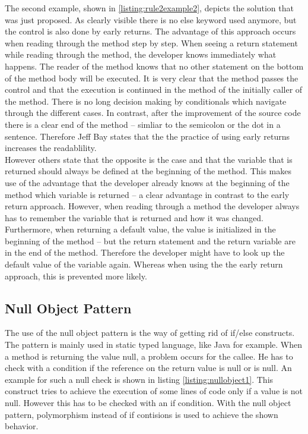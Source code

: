 The second example, shown in \ref{listing:rule2example2}, depicts the solution that was just proposed. As clearly visible there is no else keyword used anymore, but the control is also done by early returns. The advantage of this approach occurs when reading through the method step by step. When seeing a return statement while reading through the method, the developer knows immediately what happens. The reader of the method knows that no other statement on the bottom of the method body will be executed. It is very clear that the method passes the control and that the execution is continued in the method of the initially caller of the method. There is no long decision making by conditionals which navigate through the different cases. In contrast, after the improvement of the source code there is a clear end of the method -- simliar to the semicolon or the dot in a sentence. Therefore Jeff Bay states that the the practice of using early returns increases the  readablility. 
\\

However others state that the opposite is the case and that the variable that is returned should always be defined at the beginning of the method. This makes use of the advantage that the developer already knows at the beginning of the method which variable is returned -- a clear advantage in contrast to the early return approach. However, when reading through a method the developer always has to remember the variable that is returned and how it was changed. Furthermore, when returning a default value, the value is initialized in the beginning of the method -- but the return statement and the return variable are in the end of the method. Therefore the developer might have to look up the default value of the variable again. Whereas when using the the early return approach, this is prevented more likely.

\subsection*{Null Object Pattern}
The use of the null object pattern is the way of getting rid of if/else constructs. The pattern is mainly used in static typed language, like Java for example. When a method is returning the value null, a problem occurs for the callee. He has to check with a condition if the reference on the return value is null or is null. An example for such a null check is shown in listing \ref{listing:nullobject1}. This construct tries to achieve the execution of some lines of code only if a value is not null. However this has to be checked with an if condition. With the null object pattern, polymorphism instead of if contisions is used to achieve the shown behavior.
\\

